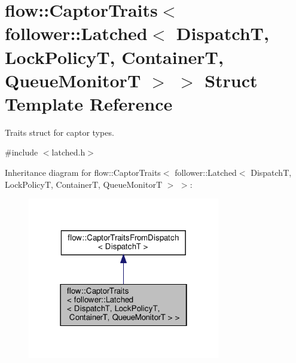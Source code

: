 \hypertarget{structflow_1_1_captor_traits_3_01follower_1_1_latched_3_01_dispatch_t_00_01_lock_policy_t_00_01_7069ffe3c5f41ae454dc415b835f945a}{}\section{flow\+:\+:Captor\+Traits$<$ follower\+:\+:Latched$<$ DispatchT, Lock\+PolicyT, ContainerT, Queue\+MonitorT $>$ $>$ Struct Template Reference}
\label{structflow_1_1_captor_traits_3_01follower_1_1_latched_3_01_dispatch_t_00_01_lock_policy_t_00_01_7069ffe3c5f41ae454dc415b835f945a}


Traits struct for captor types.  




{\ttfamily \#include $<$latched.\+h$>$}



Inheritance diagram for flow\+:\+:Captor\+Traits$<$ follower\+:\+:Latched$<$ DispatchT, Lock\+PolicyT, ContainerT, Queue\+MonitorT $>$ $>$\+:
\nopagebreak
\begin{figure}[H]
\begin{center}
\leavevmode
\includegraphics[width=238pt]{structflow_1_1_captor_traits_3_01follower_1_1_latched_3_01_dispatch_t_00_01_lock_policy_t_00_01_3b9e00ddf2349f1533eca02f3abf2d0f}
\end{center}
\end{figure}


